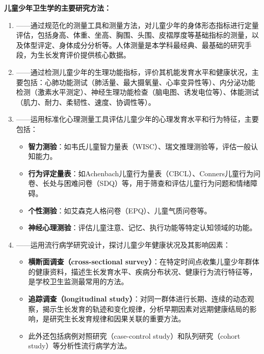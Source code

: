 \begin{defbox}
\textbf{儿童少年卫生学的主要研究方法：}

\begin{enumerate}[leftmargin=*]
    \item {}——通过规范化的测量工具和测量方法，对儿童少年的身体形态指标进行定量评估，包括身高、体重、坐高、胸围、头围、皮褶厚度等基础指标的测量，以及体型评定、身体成分分析等。人体测量是本学科最经典、最基础的研究手段，为生长发育评价提供核心数据。

    \item {}——通过检测儿童少年的生理功能指标，评价其机能发育水平和健康状况，主要包括：心肺功能测试（肺活量、最大摄氧量、心率变异性等）、内分泌功能检测（激素水平测定）、神经生理功能检查（脑电图、诱发电位等）、体能测试（肌力、耐力、柔韧性、速度、协调性等）。

    \item {}——运用标准化心理测量工具评估儿童少年的心理发育水平和行为特征，主要包括：
        \begin{itemize}
            \item \textbf{智力测验}：如韦氏儿童智力量表（WISC）、瑞文推理测验等，评估一般认知能力。
            \item \textbf{行为评定量表}：如Achenbach儿童行为量表（CBCL）、Conners儿童行为问卷、长处与困难问卷（SDQ）等，用于筛查和评估儿童行为问题和情绪障碍。
            \item \textbf{个性测验}：如艾森克人格问卷（EPQ）、儿童气质问卷等。
            \item \textbf{神经心理测验}：评估儿童注意、记忆、执行功能等特定认知领域的功能。
        \end{itemize}

    \item {}——运用流行病学研究设计，探讨儿童少年健康状况及其影响因素：
        \begin{itemize}
            \item \textbf{横断面调查（cross-sectional survey）}：在特定时间点收集儿童少年群体的健康资料，描述生长发育水平、疾病分布状况、健康行为流行特征等，是学校卫生监测最常用的方法。
            \item \textbf{追踪调查（longitudinal study）}：对同一群体进行长期、连续的动态观察，揭示生长发育的轨迹和变化规律，分析早期因素对远期健康结局的影响，是研究生长发育规律和因果关联的重要方法。
            \item 此外还包括病例对照研究（case-control study）和队列研究（cohort study）等分析性流行病学方法。
        \end{itemize}


\end{enumerate}
\end{defbox}
